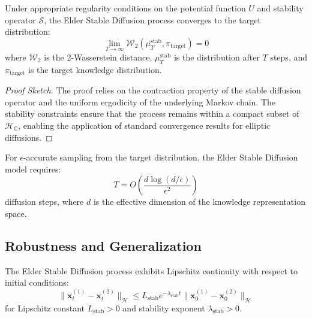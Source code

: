 \begin{theorem}
Under appropriate regularity conditions on the potential function $U$ and stability operator $\mathcal{S}$, the Elder Stable Diffusion process converges to the target distribution:
\begin{equation}
\lim_{T \to \infty} \mathcal{W}_2(\mu_T^{\text{stab}}, \pi_{\text{target}}) = 0
\end{equation}
where $\mathcal{W}_2$ is the 2-Wasserstein distance, $\mu_T^{\text{stab}}$ is the distribution after $T$ steps, and $\pi_{\text{target}}$ is the target knowledge distribution.
\end{theorem}

\begin{proof}[Proof Sketch]
The proof relies on the contraction property of the stable diffusion operator and the uniform ergodicity of the underlying Markov chain. The stability constraints ensure that the process remains within a compact subset of $\mathcal{H}_{\mathbb{C}}$, enabling the application of standard convergence results for elliptic diffusions.
\end{proof}

\begin{theorem}
For $\epsilon$-accurate sampling from the target distribution, the Elder Stable Diffusion model requires:
\begin{equation}
T = O\left(\frac{d \log(d/\epsilon)}{\epsilon^2}\right)
\end{equation}
diffusion steps, where $d$ is the effective dimension of the knowledge representation space.
\end{theorem}

\subsection{Robustness and Generalization}

\begin{theorem}
The Elder Stable Diffusion process exhibits Lipschitz continuity with respect to initial conditions:
\begin{equation}
\|\mathbf{x}_t^{(1)} - \mathbf{x}_t^{(2)}\|_{\mathcal{H}} \leq L_{\text{stab}} e^{-\lambda_{\text{stab}} t} \|\mathbf{x}_0^{(1)} - \mathbf{x}_0^{(2)}\|_{\mathcal{H}}
\end{equation}
for Lipschitz constant $L_{\text{stab}} > 0$ and stability exponent $\lambda_{\text{stab}} > 0$.
\end{theorem}

